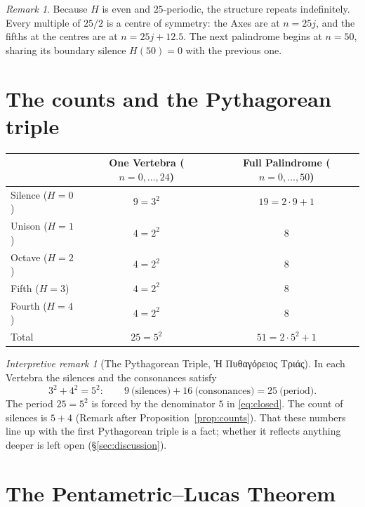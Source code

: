 \documentclass[11pt,a4paper]{article}
\newcommand{\gr}[1]{{\greekfont #1}}                 %
\theoremstyle{plain}
\theoremstyle{definition}
\theoremstyle{remark}
\newtheorem{remark}[theorem]{Remark}
\newtheorem*{interp}{Interpretive remark}
\begin{document}
\begin{remark}
Because $H$ is even and $25$-periodic, the structure repeats indefinitely. Every multiple of $25/2$ is a centre of symmetry: the Axes are at $n=25j$, and the fifths at the centres are at $n=25j+12.5$. The next palindrome begins at $n=50$, sharing its boundary silence $H(50)=0$ with the previous one.
\end{remark}

\section{The counts and the Pythagorean triple}\label{sec:counts}

\begin{center}
\begin{tabular}{@{}lcc@{}}
\toprule
 & One Vertebra ($n=0,\dots,24$) & Full Palindrome ($n=0,\dots,50$) \\
\midrule
Silence ($H=0$) & $9=3^{2}$ & $19=2\cdot 9+1$ \\
Unison ($H=1$) & $4=2^{2}$ & $8$ \\
Octave ($H=2$) & $4=2^{2}$ & $8$ \\
Fifth ($H=3$) & $4=2^{2}$ & $8$ \\
Fourth ($H=4$) & $4=2^{2}$ & $8$ \\
\midrule
Total & $25=5^{2}$ & $51=2\cdot5^{2}+1$ \\
\bottomrule
\end{tabular}
\end{center}

\begin{interp}[The Pythagorean Triple, \gr{Ἡ Πυθαγόρειος Τριάς}]
In each Vertebra the silences and the consonances satisfy
\[
  3^{2}+4^{2}=5^{2}:\qquad 9\ \text{(silences)}+16\ \text{(consonances)}=25\ \text{(period)}.
\]
The period $25=5^{2}$ is forced by the denominator $5$ in \eqref{eq:closed}. The count of silences is $5+4$ (Remark after Proposition~\ref{prop:counts}). That these numbers line up with the first Pythagorean triple is a fact; whether it reflects anything deeper is left open (§\ref{sec:discussion}).
\end{interp}

\section{The Pentametric–Lucas Theorem}\label{sec:lucas}
\end{document}
